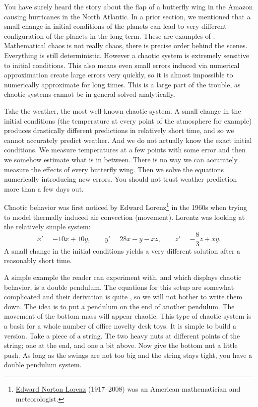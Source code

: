 
You have surely heard the story about the
flap of a butterfly wing in the Amazon causing hurricanes in the North
Atlantic.  In a prior section, we mentioned that a small change in
initial conditions of the planets can lead to very different configuration
of the planets in the long term.  These are examples of
\emph{}.
Mathematical chaos is not really chaos, there is precise order behind the
scenes.  Everything is still deterministic.  However a chaotic system is extremely
sensitive to initial conditions.  This also means even small errors induced 
via numerical approximation create large errors very quickly, so it is
almost impossible to numerically approximate for long times.
This is a large part of
the trouble, as chaotic systems cannot be in general solved analytically.

Take the weather, the most well-known chaotic system.
A small change in the initial conditions
(the temperature at every point of the atmosphere for example) produces
drastically different predictions in relatively short time, and so we cannot
accurately predict weather.  And we do not actually know the
exact initial conditions.  We measure temperatures at a few points with some
error and then we somehow estimate what is in between.
There is no way we
can accurately measure the effects of every butterfly wing.
Then
we solve the equations numerically introducing new errors.  You
should not trust weather prediction more than a few days out.

Chaotic behavior was first noticed by Edward
Lorenz\footnote{\href{https://en.wikipedia.org/wiki/Edward_Norton_Lorenz}{Edward Norton Lorenz} (1917--2008) was
an American mathematician and meteorologist.}
in the
1960s when trying to model thermally induced air convection (movement).
Lorentz was looking at the relatively simple system:
\begin{equation*}
x' = -10x +10y, \qquad y' = 28x-y-xz, \qquad z'=-\frac{8}{3}z + xy .
\end{equation*}
A small change in the initial conditions yields a very different solution
after a reasonably short time.

\begin{mywrapfigsimp}{0.95in}{1.25in}
\noindent
{}
\end{mywrapfigsimp}
A simple example the reader can experiment with, and which displays
chaotic behavior, is a double pendulum.  The equations for this
setup are somewhat complicated and their derivation is quite
, so we
will not bother to write them down.  The idea is to put a pendulum on the
end of another pendulum.  The movement of the bottom mass
will appear chaotic.  This type of chaotic system is a basis for a
whole number of office novelty desk toys.  It is simple to build a
version.  Take a piece of a string.  Tie two heavy nuts at different
points of the string; one at the end, and one a bit above.  Now give the
bottom nut a little push.  As long as the swings are not too big and the
string stays tight, you have a double pendulum system.

